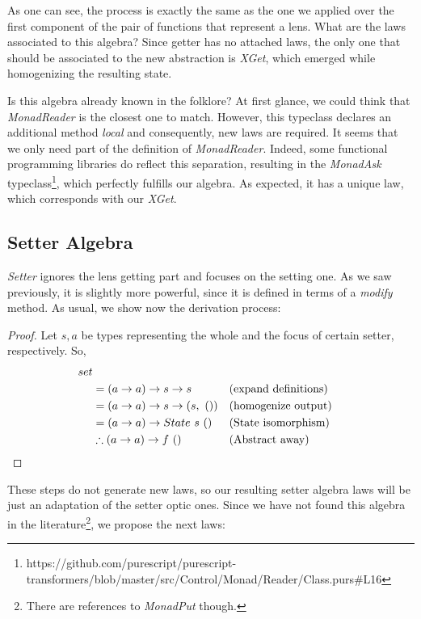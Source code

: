 \documentclass[a4paper]{article}
\begin{document}
As one can see, the process is exactly the same as the one we applied over the
first component of the pair of functions that represent a lens. What are the
laws associated to this algebra? Since getter has no attached laws, the only one
that should be associated to the new abstraction is \emph{XGet}, which emerged
while homogenizing the resulting state.

Is this algebra already known in the folklore? At first glance, we could think
that \emph{MonadReader} is the closest one to match. However, this typeclass
declares an additional method \emph{local} and consequently, new laws are
required. It seems that we only need part of the definition of
\emph{MonadReader}. Indeed, some functional programming libraries do reflect
this separation, resulting in the \emph{MonadAsk}
typeclass\footnote{https://github.com/purescript/purescript-transformers/blob/master/src/Control/Monad/Reader/Class.purs\#L16},
which perfectly fulfills our algebra. As expected, it has a unique law, which
corresponds with our \emph{XGet}.

\subsection{Setter Algebra}

\emph{Setter} ignores the lens getting part and focuses on the setting one. As
we saw previously, it is slightly more powerful, since it is defined in terms of
a \emph{modify} method. As usual, we show now the derivation process:

\begin{proof}
  Let $s, a$ be types representing the whole and the focus of certain setter,
  respectively. So,
  \begin{align*}
    set \\
    &= (a \rightarrow a) \rightarrow s \rightarrow s &&\text{(expand definitions)} \\
    &= (a \rightarrow a) \rightarrow s \rightarrow (s,\ ()) &&\text{(homogenize output)} \\
    &= (a \rightarrow a) \rightarrow State\ s\ () &&\text{(State isomorphism)} \\
    &\therefore (a \rightarrow a) \rightarrow f\ () &&\text{(Abstract away)}\qedhere
  \end{align*}
\end{proof}

These steps do not generate new laws, so our resulting setter algebra laws will
be just an adaptation of the setter optic ones. Since we have not found this
algebra in the literature\footnote{There are references to \emph{MonadPut}
though.}, we propose the next laws:
\end{document}
